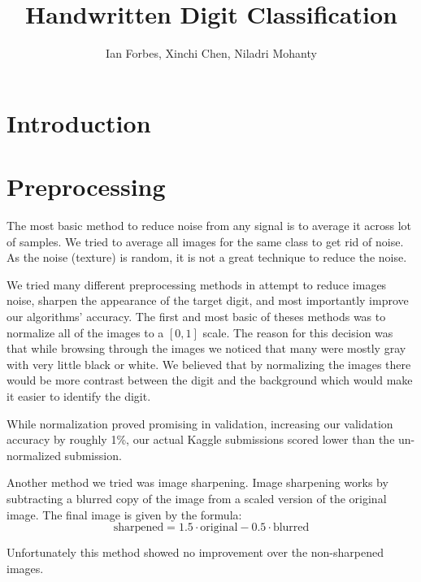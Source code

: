 \documentclass[10pt,twocolumn]{article}
\title{Handwritten Digit Classification}
\author{Ian Forbes, Xinchi Chen, Niladri Mohanty}
\begin{document}
\section{Introduction}

\section{Preprocessing}
The most basic method to reduce noise from any signal is to average it across lot of samples.  We tried to average all images for the same class to get rid of noise. As the noise (texture) is random, it is not a great technique to reduce the noise.

We tried many different preprocessing methods in attempt to reduce images noise, sharpen the appearance of the target digit, and most importantly improve our algorithms' accuracy. The first and most basic of theses methods was to normalize all of the images to a $[0,1]$ scale. The reason for this decision was that while browsing through the images we noticed that many were mostly gray with very little black or white. We believed that by normalizing the images there would be more contrast between the digit and the background which would make it easier to identify the digit.

While normalization proved promising in validation, increasing our validation accuracy by roughly 1\%, our actual Kaggle submissions scored lower than the un-normalized submission.

Another method we tried was image sharpening. Image sharpening works by subtracting a blurred copy of the image from a scaled version of the original image. The final image is given by the formula: \[\text{sharpened} = 1.5 \cdot \text{original} - 0.5 \cdot \text{blurred}\]

Unfortunately this method showed no improvement over the non-sharpened images.
\end{document}
